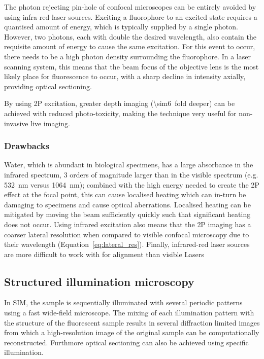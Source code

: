 The photon rejecting pin-hole of \gls{confocal microscope}s can be entirely avoided by using infra-red laser sources.
Exciting a \gls{fluorophore} to an excited state requires a quantised amount of energy, which is typically supplied by a single photon.
However, two photons, each with double the desired wavelength, also contain the requisite amount of energy to cause the same excitation.
For this event to occur, there needs to be a high photon density surrounding the \gls{fluorophore}.
In a laser scanning system, this means that the beam focus of the \gls{objective lens} is the most likely place for fluorescence to occur, with a sharp decline in intensity axially, providing optical sectioning.

By using \gls{2P} excitation, greater depth imaging (\SI{\sim6}{fold} deeper) can be achieved with reduced \gls{photo-toxicity}, making the technique very useful for non-invasive live imaging.

\subsubsection{Drawbacks} %

Water, which is abundant in biological specimens, has a large absorbance in the infrared spectrum, 3 orders of magnitude larger than in the visible spectrum (e.g. \SI{532}{\nano\meter} versus \SI{1064}{\nano\meter});
combined with the high energy needed to create the \gls{2P} effect at the focal point, this can cause localised heating which can in-turn be damaging to specimens and cause optical \gls{aberration}s.
Localised heating can be mitigated by moving the beam sufficiently quickly such that significant heating does not occur.
Using infrared excitation also means that the \gls{2P} imaging has a coarser lateral resolution when compared to visible confocal microscopy due to their wavelength (Equation~\eqref{eq:lateral_res}).
Finally, infrared-red laser sources are more difficult to work with for alignment than visible \gls{Laser}s

\subsection{Structured illumination microscopy}\label{sec:SIM_theory}

In \gls{SIM}, the sample is sequentially illuminated with several periodic patterns using a fast \gls{wide-field} microscope.
The mixing of each illumination pattern with the structure of the fluorescent sample results in several diffraction limited images from which a high-resolution image of the original sample can be computationally reconstructed.
Furthmore optical sectioning can also be achieved using specific illumination.

